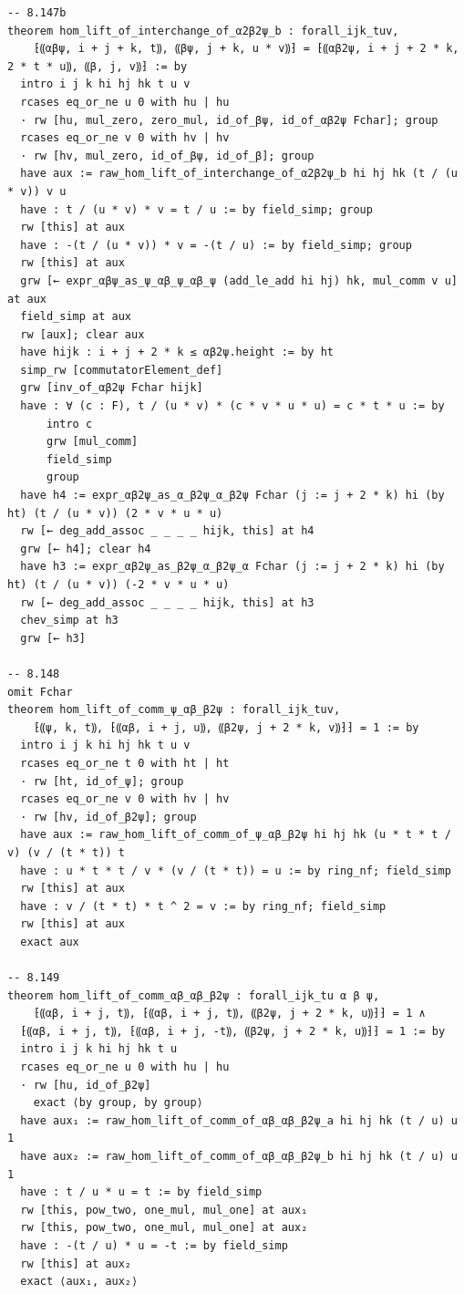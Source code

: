\documentclass[10pt,a4paper]{article}
\begin{document}
\begin{Verbatim}
-- 8.147b
theorem hom_lift_of_interchange_of_α2β2ψ_b : forall_ijk_tuv,
    ⁅⸨αβψ, i + j + k, t⸩, ⸨βψ, j + k, u * v⸩⁆ = ⁅⸨αβ2ψ, i + j + 2 * k, 2 * t * u⸩, ⸨β, j, v⸩⁆ := by
  intro i j k hi hj hk t u v
  rcases eq_or_ne u 0 with hu | hu
  · rw [hu, mul_zero, zero_mul, id_of_βψ, id_of_αβ2ψ Fchar]; group
  rcases eq_or_ne v 0 with hv | hv
  · rw [hv, mul_zero, id_of_βψ, id_of_β]; group
  have aux := raw_hom_lift_of_interchange_of_α2β2ψ_b hi hj hk (t / (u * v)) v u
  have : t / (u * v) * v = t / u := by field_simp; group
  rw [this] at aux
  have : -(t / (u * v)) * v = -(t / u) := by field_simp; group
  rw [this] at aux
  grw [← expr_αβψ_as_ψ_αβ_ψ_αβ_ψ (add_le_add hi hj) hk, mul_comm v u] at aux
  field_simp at aux
  rw [aux]; clear aux
  have hijk : i + j + 2 * k ≤ αβ2ψ.height := by ht
  simp_rw [commutatorElement_def]
  grw [inv_of_αβ2ψ Fchar hijk]
  have : ∀ (c : F), t / (u * v) * (c * v * u * u) = c * t * u := by
      intro c
      grw [mul_comm]
      field_simp
      group
  have h4 := expr_αβ2ψ_as_α_β2ψ_α_β2ψ Fchar (j := j + 2 * k) hi (by ht) (t / (u * v)) (2 * v * u * u)
  rw [← deg_add_assoc _ _ _ _ hijk, this] at h4
  grw [← h4]; clear h4
  have h3 := expr_αβ2ψ_as_β2ψ_α_β2ψ_α Fchar (j := j + 2 * k) hi (by ht) (t / (u * v)) (-2 * v * u * u)
  rw [← deg_add_assoc _ _ _ _ hijk, this] at h3
  chev_simp at h3
  grw [← h3]

-- 8.148
omit Fchar
theorem hom_lift_of_comm_ψ_αβ_β2ψ : forall_ijk_tuv,
    ⁅⸨ψ, k, t⸩, ⁅⸨αβ, i + j, u⸩, ⸨β2ψ, j + 2 * k, v⸩⁆⁆ = 1 := by
  intro i j k hi hj hk t u v
  rcases eq_or_ne t 0 with ht | ht
  · rw [ht, id_of_ψ]; group
  rcases eq_or_ne v 0 with hv | hv
  · rw [hv, id_of_β2ψ]; group
  have aux := raw_hom_lift_of_comm_of_ψ_αβ_β2ψ hi hj hk (u * t * t / v) (v / (t * t)) t
  have : u * t * t / v * (v / (t * t)) = u := by ring_nf; field_simp
  rw [this] at aux
  have : v / (t * t) * t ^ 2 = v := by ring_nf; field_simp
  rw [this] at aux
  exact aux

-- 8.149
theorem hom_lift_of_comm_αβ_αβ_β2ψ : forall_ijk_tu α β ψ,
    ⁅⸨αβ, i + j, t⸩, ⁅⸨αβ, i + j, t⸩, ⸨β2ψ, j + 2 * k, u⸩⁆⁆ = 1 ∧
  ⁅⸨αβ, i + j, t⸩, ⁅⸨αβ, i + j, -t⸩, ⸨β2ψ, j + 2 * k, u⸩⁆⁆ = 1 := by
  intro i j k hi hj hk t u
  rcases eq_or_ne u 0 with hu | hu
  · rw [hu, id_of_β2ψ]
    exact ⟨by group, by group⟩
  have aux₁ := raw_hom_lift_of_comm_of_αβ_αβ_β2ψ_a hi hj hk (t / u) u 1
  have aux₂ := raw_hom_lift_of_comm_of_αβ_αβ_β2ψ_b hi hj hk (t / u) u 1
  have : t / u * u = t := by field_simp
  rw [this, pow_two, one_mul, mul_one] at aux₁
  rw [this, pow_two, one_mul, mul_one] at aux₂
  have : -(t / u) * u = -t := by field_simp
  rw [this] at aux₂
  exact ⟨aux₁, aux₂⟩


\end{Verbatim}
\end{document}
